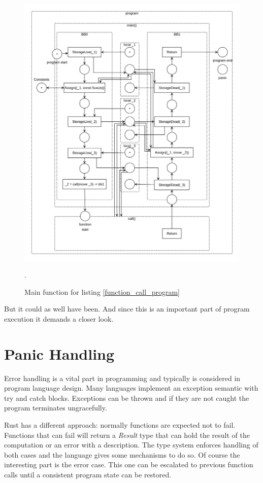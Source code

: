 \begin{figure}
    \centering
    \includegraphics[width=.95\textwidth]{../diagrams/FunctionCallNetPruned.png}
    \caption{Main function for listing \ref{function_call_program}}.
    \label{function_call_net_pruned}
\end{figure}


But it could as well have been.
And since this is an important part of program execution it demands a closer look.

\section{Panic Handling}
Error handling is a vital part in programming and typically is considered in program language design.
Many languages implement an exception semantic with try and catch blocks.
Exceptions can be thrown and if they are not caught the program terminates ungracefully.

Rust has a different approach: normally functions are expected not to fail.
Functions that can fail will return a \textit{Result} type that can hold the result of the computation or an error with a description.
The type system enforces handling of both cases and the language gives some mechanisms to do so.
Of course the interesting part is the error case.
This one can be escalated to previous function calls until a consistent program state can be restored.

